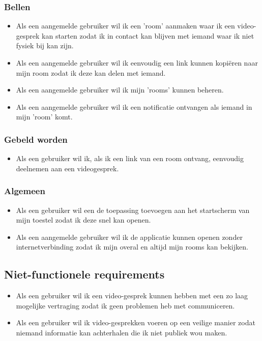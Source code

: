 		 \subsubsection{Bellen}
			  \begin{itemize}
			   	\item Als een aangemelde gebruiker wil ik een 'room' aanmaken waar ik een video-gesprek kan starten zodat ik in contact kan blijven met iemand waar ik niet fysiek bij kan zijn.
			   	\item Als een aangemelde gebruiker wil ik eenvoudig een link kunnen kopiëren naar mijn room zodat ik deze kan delen met iemand.
			   	\item Als een aangemelde gebruiker wil ik mijn 'rooms' kunnen beheren.
			   	\item Als een aangemelde gebruiker wil ik een notificatie ontvangen als iemand in mijn 'room' komt.
			  \end{itemize}
	 	
	 	\subsubsection{Gebeld worden}
	 	 \begin{itemize}
				\item Als een gebruiker wil ik, als ik een link van een room ontvang, eenvoudig deelnemen aan een videogesprek.
	 	 \end{itemize}
	
		\subsubsection{Algemeen}
	 		\begin{itemize}
	 			\item Als een gebruiker wil een de toepassing toevoegen aan het startscherm van mijn toestel zodat ik deze snel kan openen.
	 			\item Als een aangemelde gebruiker wil ik de applicatie kunnen openen zonder internetverbinding zodat ik mijn overal en altijd mijn rooms kan bekijken.
			\end{itemize}
	 
	\subsection{Niet-functionele requirements}
		\begin{itemize}
			\item Als een gebruiker wil ik een video-gesprek kunnen hebben met een zo laag mogelijke vertraging zodat ik geen problemen heb met communiceren.
			\item Als een gebruiker wil ik video-gesprekken voeren op een veilige manier zodat niemand informatie kan achterhalen die ik niet publiek wou maken.
		\end{itemize} 
		


